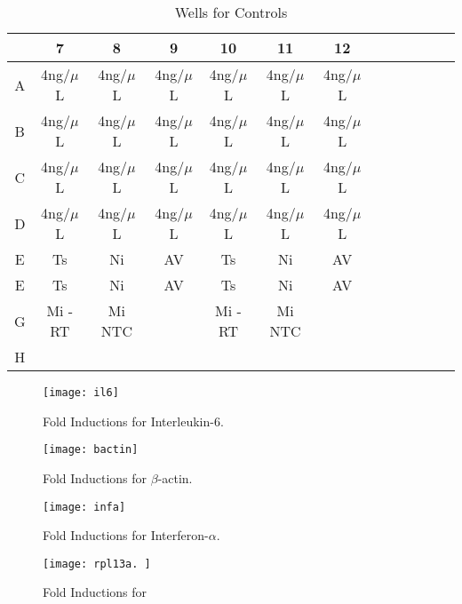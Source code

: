 \documentclass[journal, a4paper]{IEEEtran}
\begin{document}
  \begin{table}[!hbt]
    \begin{center}
    \caption{Wells for Controls}
    \label{tab:simParameters}
    \begin{tabular}{|c|c|c|c|c|c|c|c|c|c|c|c|c|}
      \hline
      & 7 & 8 & 9 & 10 & 11 & 12 \\
      \hline
      A & 4ng/$\mu$L & 4ng/$\mu$L & 4ng/$\mu$L & 4ng/$\mu$L & 4ng/$\mu$L & 4ng/$\mu$L\\
      \hline
      B & 4ng/$\mu$L & 4ng/$\mu$L & 4ng/$\mu$L & 4ng/$\mu$L & 4ng/$\mu$L & 4ng/$\mu$L\\
      \hline
      C & 4ng/$\mu$L & 4ng/$\mu$L & 4ng/$\mu$L & 4ng/$\mu$L & 4ng/$\mu$L & 4ng/$\mu$L\\
      \hline
      D & 4ng/$\mu$L & 4ng/$\mu$L & 4ng/$\mu$L & 4ng/$\mu$L & 4ng/$\mu$L & 4ng/$\mu$L\\
      \hline
      E & Ts & Ni & AV & Ts & Ni & AV\\
      \hline
      E & Ts & Ni & AV & Ts & Ni & AV\\
      \hline
      G & Mi -RT & Mi NTC & & Mi -RT & Mi NTC & \\
      \hline
      H & & & & & &\\
      \hline
    \end{tabular}
    \end{center}
  \end{table}

  \begin{figure}[t]
    \centering
    \texttt{[image: il6]}
    \caption{Fold Inductions for Interleukin-6. }
    \label{fig:mesh1}
  \end{figure}

  \begin{figure}[t]
    \centering
    \texttt{[image: bactin]}
    \caption{Fold Inductions for $\beta$-actin. }
    \label{fig:mesh1}
  \end{figure}

  \begin{figure}[t]
    \centering
    \texttt{[image: infa]}
    \caption{Fold Inductions for Interferon-$\alpha$. }
    \label{fig:mesh1}
  \end{figure}

  \begin{figure}[t]
    \centering
    \texttt{[image: rpl13a. ]}
    \caption{Fold Inductions for}
    \label{fig:mesh1}
  \end{figure}
\end{document}
